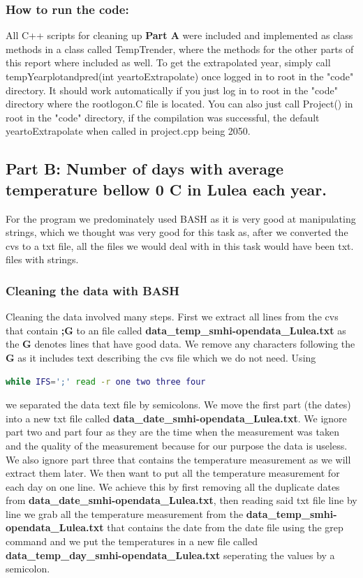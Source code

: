 \documentclass[a4paper]{article}
\begin{document}
\subsubsection{How to run the code:}
All C++ scripts for cleaning up \textbf{Part A} were included and implemented as class methods in a class called TempTrender, where the methods for the other parts of this report where included as well. To get the extrapolated year, simply call tempYearplotandpred(int yeartoExtrapolate) once logged in to root in the "code" directory. It should work automatically if you just log in to root in the "code" directory where the rootlogon.C file is located. You can also just call Project() in root in the "code" directory, if the compilation was successful, the default yeartoExtrapolate when called in project.cpp being 2050. 

\subsection{Part B: Number of days with average temperature bellow 0 C \degree in Lulea each
year.}
For the program we predominately used BASH as it is very good at manipulating strings,  which we thought was very good for this task as, after we converted the cvs to a txt file, all the files we would deal with in this task would have been txt. files with strings.
\subsubsection{Cleaning the data with BASH}
Cleaning the data involved many steps.
First we extract all lines from the cvs that contain \textbf{;G} to an file called \textbf{data\_temp\_smhi-opendata\_Lulea.txt} as the \textbf{G} denotes lines that have good data. We remove any characters following the \textbf{G} as it includes text describing the cvs file which we do not need.
Using \begin{lstlisting}[language=Bash]
while IFS=';' read -r one two three four
\end{lstlisting}  we separated the data text file by semicolons. We move the first part (the dates) into a new txt file called \textbf{data\_date\_smhi-opendata\_Lulea.txt}. We ignore part two and part four as they are the time when the measurement was taken and the quality of the measurement because for our purpose the data is useless. We also ignore part three that contains the temperature measurement as we will extract them later. 
\newline
\newline
We then want to put all the temperature measurement for each day on one line. We achieve this by first removing all the duplicate dates from \textbf{data\_date\_smhi-opendata\_Lulea.txt}, then reading said txt file line by line we grab all the temperature measurement from the \textbf{data\_temp\_smhi-opendata\_Lulea.txt} that contains the date from the date file using the grep command and we put the temperatures in a new file called \textbf{data\_temp\_day\_smhi-opendata\_Lulea.txt} seperating the values by a semicolon.
\end{document}
